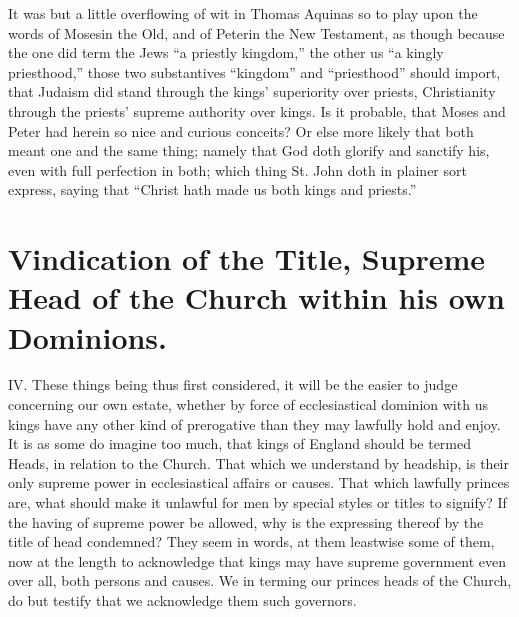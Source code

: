 It was but a little overflowing of wit in Thomas Aquinas so to play upon the words of Mosesin the Old, and of Peterin the New Testament, as though because the one did term the Jews “a priestly kingdom,” the other us “a kingly priesthood,” those two substantives “kingdom” and “priesthood” should import, that Judaism did stand through the kings’ superiority over priests, Christianity through the priests’ supreme authority over kings. Is it probable, that Moses and Peter had herein so nice and curious conceits? Or else more likely that both meant one and the same thing; namely that God doth glorify and sanctify his, even with full perfection in both; which thing St. John doth in plainer sort express, saying that “Christ hath made us both kings and priests.”

\section*{Vindication of the Title, Supreme Head of the Church within his own Dominions.}

IV. These things being thus first considered, it will be the easier to judge concerning our own estate, whether by force of ecclesiastical dominion with us kings have any other kind of prerogative than they may lawfully hold and enjoy. It is as some do imagine too much, that kings of England should be termed Heads, in relation to the Church.
That which we understand by headship, is their only supreme power in ecclesiastical affairs or causes. That which lawfully princes are, what should make it unlawful for men by special styles or titles to signify? If the having of supreme power be allowed, why is the expressing thereof by the title of head condemned? They seem in words, at them leastwise some of them, now at the length to acknowledge that kings may have supreme government even over all, both persons and causes. We in terming our princes heads of the Church, do but testify that we acknowledge them such governors.

